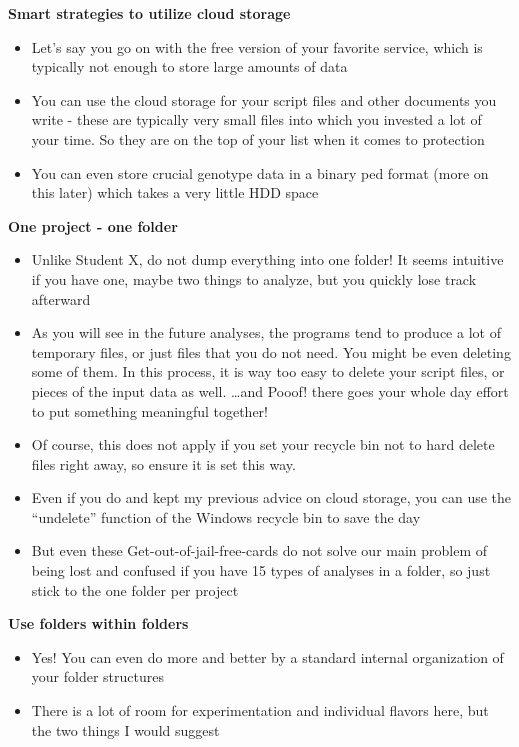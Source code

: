 \documentclass[]{book}
\providecommand{\tightlist}{%
  \setlength{\itemsep}{0pt}\setlength{\parskip}{0pt}}
\begin{document}
\textbf{Smart strategies to utilize cloud storage}

\begin{itemize}
\tightlist
\item
  Let's say you go on with the free version of your favorite service,
  which is typically not enough to store large amounts of data
\item
  You can use the cloud storage for your script files and other
  documents you write - these are typically very small files into which
  you invested a lot of your time. So they are on the top of your list
  when it comes to protection
\item
  You can even store crucial genotype data in a binary ped format (more
  on this later) which takes a very little HDD space
\end{itemize}

\textbf{One project - one folder}

\begin{itemize}
\tightlist
\item
  Unlike Student X, do not dump everything into one folder! It seems
  intuitive if you have one, maybe two things to analyze, but you
  quickly lose track afterward
\item
  As you will see in the future analyses, the programs tend to produce a
  lot of temporary files, or just files that you do not need. You might
  be even deleting some of them. In this process, it is way too easy to
  delete your script files, or pieces of the input data as well.
  \ldots{}and Pooof! there goes your whole day effort to put something
  meaningful together!
\item
  Of course, this does not apply if you set your recycle bin not to hard
  delete files right away, so ensure it is set this way.
\item
  Even if you do and kept my previous advice on cloud storage, you can
  use the ``undelete'' function of the Windows recycle bin to save the
  day
\item
  But even these Get-out-of-jail-free-cards do not solve our main
  problem of being lost and confused if you have 15 types of analyses in
  a folder, so just stick to the one folder per project
\end{itemize}

\textbf{Use folders within folders}

\begin{itemize}
\tightlist
\item
  Yes! You can even do more and better by a standard internal
  organization of your folder structures
\item
  There is a lot of room for experimentation and individual flavors
  here, but the two things I would suggest
\end{itemize}
\end{document}
